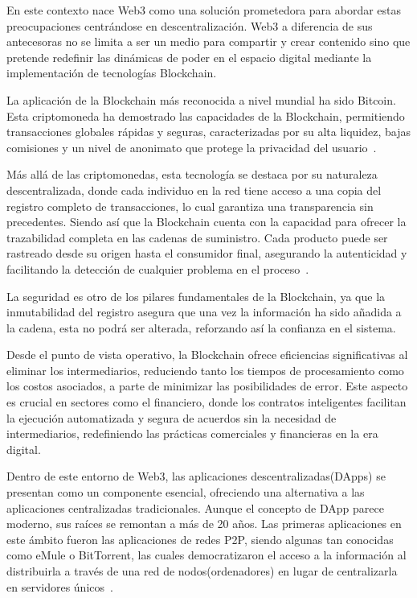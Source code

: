 En este contexto nace Web3 como una solución prometedora para abordar estas preocupaciones centrándose en descentralización. Web3 a diferencia de sus antecesoras no se limita a ser un medio para compartir y crear contenido sino que pretende redefinir las dinámicas de poder en el espacio digital mediante la implementación de tecnologías Blockchain.

La aplicación de la Blockchain más reconocida a nivel mundial ha sido Bitcoin. Esta criptomoneda ha demostrado las capacidades de la Blockchain, permitiendo transacciones globales rápidas y seguras, caracterizadas por su alta liquidez, bajas comisiones y un nivel de anonimato que protege la privacidad del usuario~\cite{introducciónBitcoin}.

Más allá de las criptomonedas, esta tecnología se destaca por su naturaleza descentralizada, donde cada individuo en la red tiene acceso a una copia del registro completo de transacciones, lo cual garantiza una transparencia sin precedentes. Siendo así que la Blockchain cuenta con la capacidad para ofrecer la trazabilidad completa en las cadenas de suministro. Cada producto puede ser rastreado desde su origen hasta el consumidor final, asegurando la autenticidad y facilitando la detección de cualquier problema en el proceso~\cite{introducciónBlockchain}.

La seguridad es otro de los pilares fundamentales de la Blockchain, ya que la inmutabilidad del registro asegura que una vez la información ha sido añadida a la cadena, esta no podrá ser alterada, reforzando así la confianza en el sistema. 

Desde el punto de vista operativo, la Blockchain ofrece eficiencias significativas al eliminar los intermediarios, reduciendo tanto los tiempos de procesamiento como los costos asociados, a parte de minimizar las posibilidades de error.
Este aspecto es crucial en sectores como el financiero, donde los contratos inteligentes facilitan la ejecución automatizada y segura de acuerdos sin la necesidad de intermediarios, redefiniendo las prácticas comerciales y financieras en la era digital.

Dentro de este entorno de Web3, las aplicaciones descentralizadas(DApps) se presentan como un componente esencial, ofreciendo una alternativa a las aplicaciones centralizadas tradicionales. 
Aunque el concepto de DApp parece moderno, sus raíces se remontan a más de 20 años. Las primeras aplicaciones en este ámbito fueron las aplicaciones de redes P2P, siendo algunas tan conocidas como eMule o BitTorrent, las cuales democratizaron el acceso a la información al distribuirla a través de una red de nodos(ordenadores) en lugar de centralizarla en servidores únicos~\cite{DApps}.

